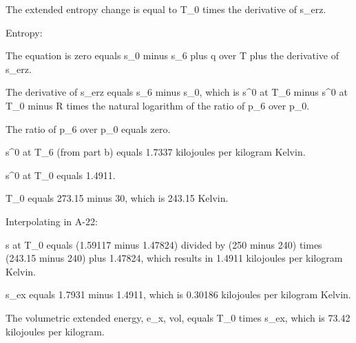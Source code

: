 The extended entropy change is equal to T_0 times the derivative of s_erz.

Entropy:

The equation is zero equals s_0 minus s_6 plus q over T plus the derivative of s_erz.

The derivative of s_erz equals s_6 minus s_0, which is s^0 at T_6 minus s^0 at T_0 minus R times the natural logarithm of the ratio of p_6 over p_0.

The ratio of p_6 over p_0 equals zero.

s^0 at T_6 (from part b) equals 1.7337 kilojoules per kilogram Kelvin.

s^0 at T_0 equals 1.4911.

T_0 equals 273.15 minus 30, which is 243.15 Kelvin.

Interpolating in A-22:

s at T_0 equals (1.59117 minus 1.47824) divided by (250 minus 240) times (243.15 minus 240) plus 1.47824, which results in 1.4911 kilojoules per kilogram Kelvin.

s_ex equals 1.7931 minus 1.4911, which is 0.30186 kilojoules per kilogram Kelvin.

The volumetric extended energy, e_x, vol, equals T_0 times s_ex, which is 73.42 kilojoules per kilogram.